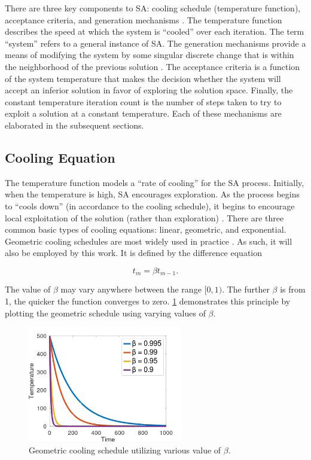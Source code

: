 \documentclass[ee,thesis]{usuthesis}
\begin{document}
There are three key components to SA: cooling schedule (temperature function), acceptance criteria, and generation
mechanisms \cite{keller-2019-multi-objec,press-1992-numer-recip}. The temperature function describes the speed at
which the system is ``cooled'' over each iteration. The term ``system'' refers to a general instance of SA. The generation
mechanisms provide a means of modifying the system by some singular discrete change that is within the neighborhood of
the previous solution \cite{gendreau-2018-handb-metah}. The acceptance criteria is a function of the system temperature
that makes the decision whether the system will accept an inferior solution in favor of exploring the solution space.
Finally, the constant temperature iteration count is the number of steps taken to try to exploit a solution at a
constant temperature. Each of these mechanisms are elaborated in the subsequent sections.

\subsection{Cooling Equation}
\label{cooling-equation-experimental}
The temperature function models a ``rate of cooling'' for the SA process. Initially, when the temperature is high, SA
encourages exploration. As the process begins to ``cools down'' (in accordance to the cooling schedule), it begins to
encourage local exploitation of the solution (rather than exploration)
\cite{rutenbar-1989-simul-anneal-algor,henderson-1989-theor-pract}. There are three common basic types of cooling
equations: linear, geometric, and exponential. Geometric cooling schedules are most widely used in practice
\cite{keller-2019-multi-objec}. As such, it will also be employed by this work. It is defined by the difference
equation

\begin{equation}
\label{eq:cool}
t_m = \beta t_{m-1}\text{.}
\end{equation}

The value of \(\beta\) may vary anywhere between the range \([0,1)\). The further \(\beta\) is from 1, the quicker the function
converges to zero. \ref{fig:geometric} demonstrates this principle by plotting the geometric schedule using varying
values of \(\beta\).

\begin{figure}[t!]
  \centering \includegraphics[width=0.6\textwidth]{img/geometric.png}
  \caption{Geometric cooling schedule utilizing various value of $\beta$.}
  \label{fig:geometric}
\end{figure}
\end{document}
